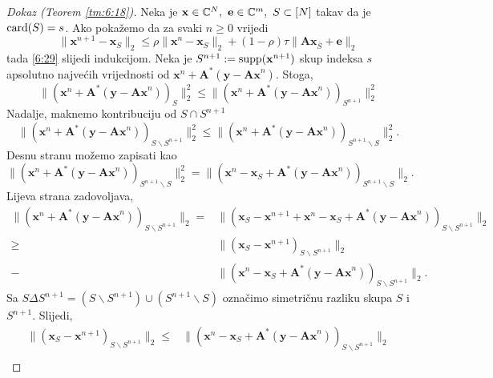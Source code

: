 \documentclass[a4paper,twoside,12pt]{memoir} %
\newcommand{\vect}[1]{\mathbf{#1}}
\renewcommand{\vec}{\vect}
\newcommand{\card}{\text{\normalfont{card}}}
\newcommand{\supp}{\text{\normalfont{supp}}}
\newcommand{\norm}[1]{\|{#1}\|}
\begin{document}
\begin{proof}[Dokaz (Teorem \ref{tm:6:18})]
    Neka je $\vec x \in \C^N,\ \vec e \in \C^m,\ S \subset [N]$ takav da je $\card(S) = s$. Ako poka\v{z}emo da za svaki $n \geq 0$ vrijedi
    \begin{equation}\label{6:30}
        \norm{\vec x^{n+1} - \vec x_S}_2 \leq \rho \norm{\vec x^n - \vec x_S}_2 + (1-\rho)\tau \norm{\vec{Ax}_{\bar S} + \vec e}_2 
    \end{equation}
    tada \eqref{6:29} slijedi indukcijom. Neka je $S^{n+1} := \supp(\vec x^{n+1})$ skup indeksa $s$ apsolutno najve\'cih vrijednosti od $\vec x^n + \vec A^*(\vec y - \vec{Ax}^n)$. Stoga,
    \begin{equation*}
        \norm{(\vec x^n + \vec A^* (\vec y - \vec{Ax}^n))_S}_2^2 \leq \norm{(\vec x^n + \vec A^* (\vec y - \vec{Ax}^n))_{S^{n+1}}}_2^2
    \end{equation*}
    Nadalje, maknemo kontribuciju od $S \cap S^{n+1}$
    \begin{equation*}
        \norm{(\vec x^n + \vec A^* (\vec y - \vec{Ax}^n))_{S \backslash S^{n+1}}}_2^2 \leq \norm{(\vec x^n + \vec A^* (\vec y - \vec{Ax}^n))_{S^{n+1} \backslash S}}_2^2.
    \end{equation*}
    Desnu stranu mo\v{z}emo zapisati kao
    \begin{equation*}
        \norm{(\vec x^n + \vec A^* (\vec y - \vec{Ax}^n))_{S^{n+1} \backslash S}}_2^2 = \norm{(\vec x^n - \vec x_S + \vec A^* (\vec y - \vec{Ax}^n))_{S^{n+1} \backslash S}}_2.
    \end{equation*}
    Lijeva strana zadovoljava,
    \begin{align*}
        \norm{(\vec x^n + \vec A^*(\vec y - \vec{Ax}^n))_{S \backslash S^{n+1}}}_2 = &\norm{(\vec x_S - \vec x^{n+1} + \vec x^n - \vec x_S + \vec A^*(\vec y - \vec{Ax}^n))_{S \backslash S^{n+1}}}_2\\
        \geq &\norm{(\vec x_S - \vec x^{n+1})_{S \backslash S^{n+1}}}_2\\ - & \norm{(\vec x^n - \vec x_S + \vec A^*(\vec y - \vec {Ax}^n))_{S \backslash S^{n+1}}}_2.
    \end{align*}
    Sa $S \Delta S^{n+1} = (S \backslash S^{n+1}) \cup (S^{n+1} \backslash S)$ ozna\v{c}imo simetri\v{c}nu razliku skupa $S$ i $S^{n+1}$. Slijedi,
    \begin{align}
        \norm{(\vec x_S - \vec x^{n+1})_{S \backslash S^{n+1}}}_2 \leq & \norm{(\vec x^n - \vec x_S + \vec A^*(\vec y - \vec{Ax}^n))_{S \backslash S^{n+1}}}_2 \nonumber \\

\end{align}
\end{proof}
\end{document}
